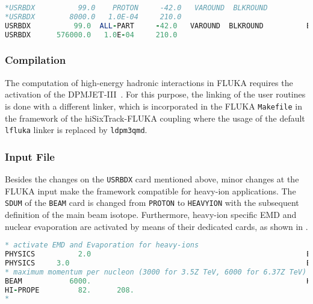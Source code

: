 \begin{appendices}
\vspace{0.5cm}
\begin{minipage}{\linewidth}
\begin{lstlisting}[language=Fortran,caption=USRBDX card in the FLUKA input for the nominal SixTrack-FLUKA coupling (commented out) and the heavy-ion version at the bottom.,label=lst:usrbdx]
*USRBDX          99.0    PROTON     -42.0   VAROUND  BLKROUND          BACK2ICO
*USRBDX        8000.0   1.0E-04     210.0                              &
USRBDX          99.0  ALL-PART     -42.0   VAROUND  BLKROUND          BACK2ICO
USRBDX      576000.0   1.0E-04     210.0                   
\end{lstlisting}
\end{minipage}


\subsubsection{Compilation}

The computation of high-energy hadronic interactions in FLUKA requires the activation of the DPMJET-III~\cite{MC2000:DPMJETIII}. For this purpose, the linking of the user routines is done with a different linker, which is incorporated in the FLUKA \texttt{Makefile} in the framework of the hiSixTrack-FLUKA coupling where the usage of the default \texttt{lfluka} linker is replaced by \texttt{ldpm3qmd}.



\subsubsection{Input File}

Besides the changes on the \texttt{USRBDX} card mentioned above, minor changes at the FLUKA input make the framework compatible for heavy-ion applications. The \texttt{SDUM} of the \texttt{BEAM} card is changed from \texttt{PROTON} to \texttt{HEAVYION} with the subsequent definition of the main beam isotope. Furthermore, heavy-ion specific EMD and nuclear evaporation are activated by means of their dedicated cards, as shown in .

\vspace{0.5cm}
\begin{minipage}{\linewidth}
\begin{lstlisting}[language=Fortran,caption=Changes in the FLUKA input for heavy-ion applications,label=lst:input]
* activate EMD and Evaporation for heavy-ions 
PHYSICS          2.0                                                  EM-DISSO 
PHYSICS     3.0                                                       EVAPORAT
* maximum momentum per nucleon (3000 for 3.5Z TeV, 6000 for 6.37Z TeV)
BEAM           6000.                                                  HEAVYION
HI-PROPE         82.      208.                                                
*
\end{lstlisting}
\end{minipage}



\end{appendices}
